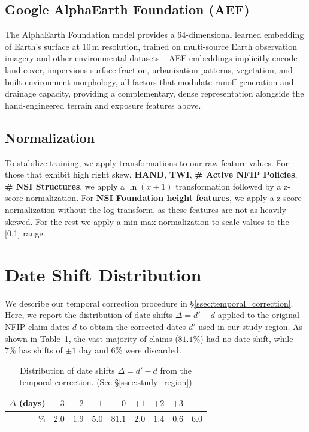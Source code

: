 \subsection{Google AlphaEarth Foundation (AEF)}
The AlphaEarth Foundation model provides a 64-dimensional learned embedding of Earth's surface at 10\,m resolution, trained on multi-source Earth observation imagery and other environmental datasets~\cite{brown_alphaearth_2025}.
%
AEF embeddings implicitly encode land cover, impervious surface fraction, urbanization patterns, vegetation, and built-environment morphology, all factors that modulate runoff generation and drainage capacity, providing a complementary, dense representation alongside the hand-engineered terrain and exposure features above.

\subsection{Normalization}
To stabilize training, we apply transformations to our raw feature values.
%
For those that exhibit high right skew, \textbf{HAND}, \textbf{TWI}, \textbf{\# Active NFIP Policies}, \textbf{\# NSI Structures}, we apply a $\ln(x+1)$ transformation followed by a z-score normalization.
%
For \textbf{NSI Foundation height features}, we apply a z-score normalization without the log transform, as these features are not as heavily skewed.
%
For the rest we apply a min-max normalization to scale values to the [0,1] range.
\section{Date Shift Distribution}
We describe our temporal correction procedure in \S\ref{ssec:temporal_correction}. 
%
Here, we report the distribution of date shifts $\Delta = d' - d$ applied to the original NFIP claim dates $d$ to obtain the corrected dates $d'$ used in our study region. As shown in Table~\ref{tab:date_shifts}, the vast majority of claims ($81.1\%$) had no date shift, while $7\%$ has shifts of $\pm 1$ day and $6\%$ were discarded.
\begin{table}[h]
\small
\centering
\setlength{\tabcolsep}{5pt}
\begin{tabular}{r *{8}{c}}
\toprule
$\Delta$ (days) & $-3$ & $-2$ & $-1$ & $\phantom{-}0$ & $+1$ & $+2$ & $+3$ & -- \\
\midrule
\% & $2.0$ & $1.9$ & $5.0$ & $\mathbf{81.1}$ & $2.0$ & $1.4$ & $0.6$ & $6.0$ \\
\bottomrule
\end{tabular}
\caption{Distribution of date shifts $\Delta = d' - d$ from the temporal correction. (See \S\ref{ssec:study_region})}
\label{tab:date_shifts}
\end{table}

